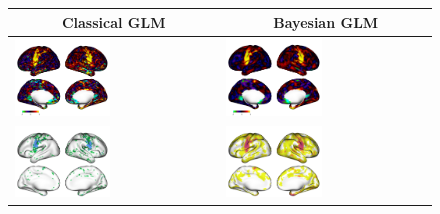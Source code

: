 \documentclass{article}
\begin{document}
\newpage

\pagestyle{empty}

\begin{figure}
		\begin{tabularx}{\textwidth}{|X|X|}
			\multicolumn{1}{c}{\textbf{Classical GLM}} & \multicolumn{1}{c}{\textbf{Bayesian GLM}}  \\ \hline
			\includegraphics[width=0.48\textwidth]{plots/601_subject_classical_tongue_estimate.png} &
			\includegraphics[width=0.48\textwidth]{plots/601_subject_bayes_tongue_estimate.png} \\ \hline
			\includegraphics[width=0.48\textwidth]{plots/601_subject_classical_tongue_activation.png} &
			\includegraphics[width=0.48\textwidth]{plots/601_subject_bayes_tongue_activation.png}  \\ 

\end{tabularx}
\end{figure}
\end{document}
